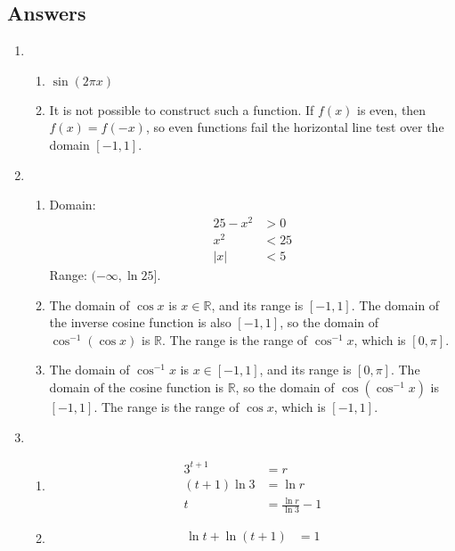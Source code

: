 \newpage\subsection*{Answers}

\SolutionsStatement

\begin{enumerate}
	
    \item 
    \begin{enumerate}
    	\item $\sin(2\pi x)$
        \item It is not possible to construct such a function. If $f(x)$ is even, then $f(x) = f(-x)$, so even functions fail the horizontal line test over the domain $[-1,1]$. 
    \end{enumerate}   
    \item 
    \begin{enumerate} 
    	\item Domain: 
        \begin{align*} 
        25 - x^2 &> 0 \\
        x^2 &< 25 \\
        |x| &< 5
        \end{align*}
        Range: $(-\infty,\ln 25]$.
        \item The domain of $\cos x$ is $x \in \mathbb R$, and its range is $[-1,1]$. The domain of the inverse cosine function is also $[-1,1]$, so the domain of $\cos^{-1} (\cos x)$ is $\mathbb R$. The range is the range of $\cos^{-1}x$, which is $[0,\pi]$.
        \item The domain of $\cos^{-1} x$ is $x \in [-1,1]$, and its range is $[0,\pi]$. The domain of the cosine function is $\mathbb R$, so the domain of $\cos (\cos^{-1} x)$ is $[-1,1]$. The range is the range of $\cos x$, which is $[-1,1]$.
    \end{enumerate}
    \item 
    	\begin{enumerate}
    	\item \begin{align*} 
        	3^{t+1} &= r \\
            (t+1) \ln 3 &= \ln r \\
            t &= \frac{\ln r}{\ln 3} -1 
        \end{align*}
        \item \begin{align*}
        	\ln t + \ln (t+1) &= 1 \\

\end{align*}
\end{enumerate}
\end{enumerate}
